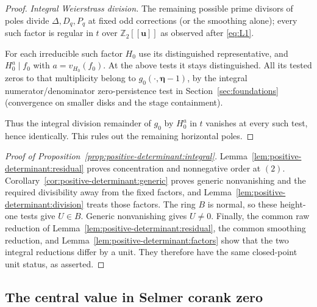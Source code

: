 \begin{proof}
\emph{Integral Weierstrass division.}
The remaining possible prime divisors of poles divide \(\Delta,D_q,P_q\) at fixed odd corrections (or the smoothing alone); every such factor is regular in \(t\) over \(\mathbb Z_2[[\mathbf u]]\) as observed after \eqref{eq:L1}. 

For each irreducible such factor \(H_0\) use its distinguished representative, and \(H_0^a\mid f_0\) with \(a=v_{H_0}(f_0)\). At the above tests it stays distinguished. All its tested zeros to that multiplicity belong to \(g_0(\cdot,\boldsymbol\eta-1)\), by the integral numerator/denominator zero-persistence test in Section~\ref{sec:foundations} (convergence on smaller disks and the stage containment). 

Thus the integral division remainder of \(g_0\) by \(H_0^a\) in \(t\) vanishes at every such test, hence identically. This rules out the remaining horizontal poles.
\end{proof}

\begin{proof}[Proof of Proposition~\ref{prop:positive-determinant:integral}]
Lemma~\ref{lem:positive-determinant:residual} proves concentration and
nonnegative order at \((2)\). Corollary~\ref{cor:positive-determinant:generic}
proves generic nonvanishing and the required divisibility away from the fixed
factors, and Lemma~\ref{lem:positive-determinant:division} treats those factors.
The ring \(B\) is normal, so these height-one tests give \(U\in B\).
Generic nonvanishing gives \(U\ne0\). Finally, the common raw reduction of
Lemma~\ref{lem:positive-determinant:residual}, the common smoothing reduction,
and Lemma~\ref{lem:positive-determinant:factors} show that the two integral
reductions differ by a unit. They therefore have the same closed-point unit
status, as asserted.
\end{proof}

\subsection{The central value in Selmer corank zero}\label{subsec:positive-determinant:rank-zero}


